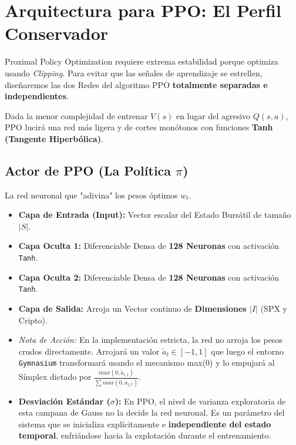 \documentclass[11pt,a4paper]{article}
\begin{document}
\section{Arquitectura para PPO: El Perfil Conservador}
Proximal Policy Optimization requiere extrema estabilidad porque optimiza usando \textit{Clipping}. Para evitar que las señales de aprendizaje se estrellen, diseñaremos las dos Redes del algoritmo PPO \textbf{totalmente separadas e independientes}.

Dada la menor complejidad de entrenar $V(s)$ en lugar del agresivo $Q(s,a)$, PPO lucirá una red más ligera y de cortes monótonos con funciones \textbf{Tanh (Tangente Hiperbólica)}.

\subsection{Actor de PPO (La Política $\pi$)}
La red neuronal que "adivina" los pesos óptimos $w_t$.
\begin{itemize}
    \item \textbf{Capa de Entrada (Input):} Vector escalar del Estado Bursátil de tamaño $|S|$.
    \item \textbf{Capa Oculta 1:} Diferenciable Densa de \textbf{128 Neuronas} con activación \texttt{Tanh}.
    \item \textbf{Capa Oculta 2:} Diferenciable Densa de \textbf{128 Neuronas} con activación \texttt{Tanh}.
    \item \textbf{Capa de Salida:} Arroja un Vector continuo de \textbf{Dimensiones $|I|$} (SPX y Cripto). 
    \item \textit{Nota de Acción:} En la implementación estricta, la red no arroja los pesos crudos directamente. Arrojará un valor $\tilde{a}_t \in [-1, 1]$ que luego el entorno \texttt{Gymnasium} transformará usando el mecanismo max(0) y lo empujará al Símplex dictado por $\frac{max(0, \tilde{a}_{i,t})}{\sum max(0, \tilde{a}_{j,t})}$. 
    \item \textbf{Desviación Estándar ($\sigma$):} En PPO, el nivel de varianza exploratoria de esta campana de Gauss no la decide la red neuronal. Es un parámetro del sistema que se inicializa explícitamente e \textbf{independiente del estado temporal}, enfriándose hacia la explotación durante el entrenamiento.
\end{itemize}
\end{document}
